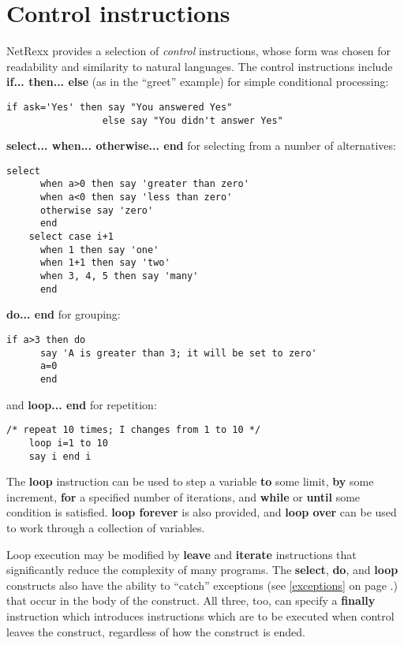 \section{Control instructions}
NetRexx provides a selection of \emph{control} instructions, whose form was
chosen for readability and similarity to natural languages. The
control instructions include \textbf{if... then... else} (as in the “greet”
example) for simple conditional processing:
\begin{lstlisting}[label=Conditional,caption=Conditional]
    if ask='Yes' then say "You answered Yes"
                 else say "You didn't answer Yes"
\end{lstlisting}
\textbf{select... when... otherwise... end} for selecting from a number of
alternatives:
\begin{lstlisting}[label=selectwhenotherwise,caption=select - when - otherwise]
    select
      when a>0 then say 'greater than zero'
      when a<0 then say 'less than zero'
      otherwise say 'zero'
      end
    select case i+1
      when 1 then say 'one'
      when 1+1 then say 'two'
      when 3, 4, 5 then say 'many'
      end
\end{lstlisting}
\textbf{do... end} for grouping:
\begin{lstlisting}[label=doend,caption=do - end]
    if a>3 then do
      say 'A is greater than 3; it will be set to zero'
      a=0
      end
\end{lstlisting}
and \textbf{loop... end} for repetition:
\begin{lstlisting}[label=loopend,caption=loop - end]
    /* repeat 10 times; I changes from 1 to 10 */
    loop i=1 to 10
    say i end i
\end{lstlisting}
The \textbf{loop} instruction can be used to step a variable
\textbf{to} some limit, \textbf{by} some increment, \textbf{for} a
specified number of iterations, and \textbf{while} or \textbf{until}
some condition is satisfied. \textbf{loop forever} is also provided,
and \textbf{loop over} can be used to work through a collection of
variables.

Loop execution may be modified by \textbf{leave} and \textbf{iterate} instructions that significantly reduce the complexity of many programs.
The \textbf{select}, \textbf{do}, and \textbf{loop} constructs also have the ability to “catch”
exceptions (see \ref{exceptions} on page \pageref{exceptions}.) that occur in the body of the construct. All
three, too, can specify a \textbf{finally} instruction which introduces
instructions which are to be executed when control leaves the
construct, regardless of how the construct is ended.


